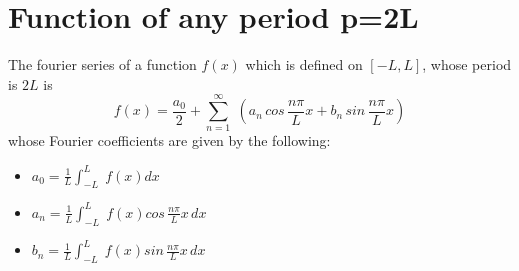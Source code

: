 \documentclass[aima331_lecturenotes_ku.tex]{subfiles}
\begin{document}
\section{Function of any period p=2L}
The fourier series of a function $f(x)$ which is defined on $[-L,L]$, whose period is $2L$ is
\begin{equation}
  \label{fourier_general}
  f(x)=\frac{a_0}{2} + \sum_{n=1}^{\infty} \; \left ( a_n\, cos\,\frac{n\pi}{L}x + b_n \, sin\,\frac{n\pi}{L}x  \right )
\end{equation}
whose Fourier coefficients are given by the following:
\begin{itemize}
\item $\displaystyle a_0 = \frac{1}{L} \int_{-L}^{L} \; f(x) dx$

\item $\displaystyle a_n = \frac{1}{L} \int_{-L}^{L} \; f(x)cos\,\frac{n\pi}{L}x \, dx$

\item $\displaystyle b_n = \frac{1}{L} \int_{-L}^{L} \; f(x)sin\,\frac{n\pi}{L}x \, dx$
\end{itemize}
\end{document}
